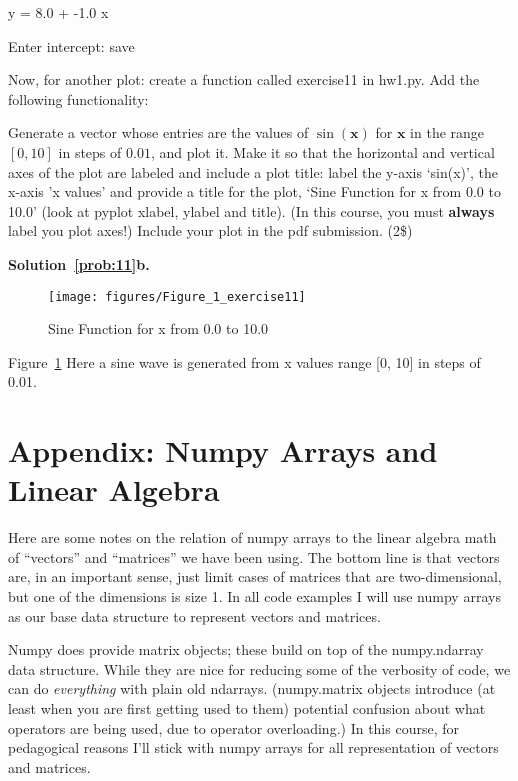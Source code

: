 \documentclass[10pt]{article}
\begin{document}
\begin{enumerate}
y = 8.0 + -1.0 x

Enter intercept: save


Now, for another plot: create a function called exercise11 in hw1.py.  Add the following functionality:

Generate a vector whose entries are the values of $\sin(\mathbf{x})$ for $\mathbf{x}$ in the range $[0,10]$ in steps of $0.01$, and plot it.  Make it so that the horizontal and vertical axes of the plot are labeled and include a plot title: label the y-axis `sin(x)', the x-axis 'x values' and provide a title for the plot, `Sine Function for x from 0.0 to 10.0' (look at pyplot xlabel, ylabel and title).  (In this course, you must {\bf always} label you plot axes!)  Include your plot in the pdf submission. (2\$)

{\bf Solution~\ref{prob:11}b.} 
\begin{figure}[htb]
\begin{center}
\texttt{[image: figures/Figure\_1\_exercise11]}
\caption{Sine Function for x from 0.0 to 10.0}
\label{plot2}
\end{center}
\end{figure}

Figure~\ref{plot2} Here a sine wave is generated from x values range [0, 10] in steps of 0.01.\\

\end{enumerate}


\newpage

\section*{Appendix: Numpy Arrays and Linear Algebra}

Here are some notes on the relation of numpy arrays to the linear algebra math of ``vectors'' and ``matrices'' we have been using.  The bottom line is that vectors are, in an important sense, just limit cases of matrices that are two-dimensional, but one of the dimensions is size 1.  In all code examples I will use numpy arrays as our base data structure to represent vectors and matrices.

Numpy does provide matrix objects; these build on top of the numpy.ndarray data structure.  While they are nice for reducing some of the verbosity of code, we can do {\em everything} with plain old ndarrays.  (numpy.matrix objects introduce (at least when you are first getting used to them) potential confusion about what operators are being used, due to operator overloading.)  In this course, for pedagogical reasons I'll stick with numpy arrays for all representation of vectors and matrices.
\end{document}
